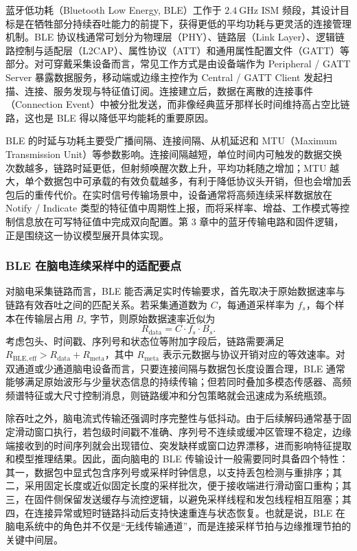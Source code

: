 蓝牙低功耗（Bluetooth Low Energy, BLE）工作于 $2.4\ \text{GHz}$ ISM 频段，其设计目标是在牺牲部分持续吞吐能力的前提下，获得更低的平均功耗与更灵活的连接管理机制。BLE 协议栈通常可划分为物理层（PHY）、链路层（Link Layer）、逻辑链路控制与适配层（L2CAP）、属性协议（ATT）和通用属性配置文件（GATT）等部分。对可穿戴采集设备而言，常见工作方式是由设备端作为 Peripheral / GATT Server 暴露数据服务，移动端或边缘主控作为 Central / GATT Client 发起扫描、连接、服务发现与特征值订阅。连接建立后，数据在离散的连接事件（Connection Event）中被分批发送，而非像经典蓝牙那样长时间维持高占空比链路，这也是 BLE 得以降低平均能耗的重要原因。

BLE 的时延与功耗主要受广播间隔、连接间隔、从机延迟和 MTU（Maximum Transmission Unit）等参数影响。连接间隔越短，单位时间内可触发的数据交换次数越多，链路时延更低，但射频唤醒次数上升，平均功耗随之增加；MTU 越大，单个数据包中可承载的有效负载越多，有利于降低协议头开销，但也会增加丢包后的重传代价。在实时信号传输场景中，设备通常将高频连续采样数据放在 Notify / Indicate 类型的特征值中周期性上报，而将采样率、增益、工作模式等控制信息放在可写特征值中完成双向配置。第 3 章中的蓝牙传输电路和固件逻辑，正是围绕这一协议模型展开具体实现。

\subsubsection{BLE 在脑电连续采样中的适配要点}

对脑电采集链路而言，BLE 能否满足实时传输要求，首先取决于原始数据速率与链路有效吞吐之间的匹配关系。若采集通道数为 $C$，每通道采样率为 $f_s$，每个样本在传输层占用 $B_s$ 字节，则原始数据速率近似为
\begin{equation}
R_{\mathrm{data}} = C \cdot f_s \cdot B_s.
\label{eq:ble_rate}
\end{equation}
考虑包头、时间戳、序列号和状态位等附加字段后，链路需要满足 $R_{\mathrm{BLE,eff}} > R_{\mathrm{data}} + R_{\mathrm{meta}}$，其中 $R_{\mathrm{meta}}$ 表示元数据与协议开销对应的等效速率。对双通道或少通道脑电设备而言，只要连接间隔与数据包长度设置合理，BLE 通常能够满足原始波形与少量状态信息的持续传输；但若同时叠加多模态传感器、高频频谱特征或大尺寸控制消息，则链路缓冲和分包策略就会迅速成为系统瓶颈。

除吞吐之外，脑电流式传输还强调时序完整性与低抖动。由于后续解码通常基于固定滑动窗口执行，若包级时间戳不准确、序列号不连续或缓冲区管理不稳定，边缘端接收到的时间序列就会出现错位、突发缺样或窗口边界漂移，进而影响特征提取和模型推理结果。因此，面向脑电的 BLE 传输设计一般需要同时具备四个特性：其一，数据包中显式包含序列号或采样时钟信息，以支持丢包检测与重排序；其二，采用固定长度或近似固定长度的采样批次，便于接收端进行滑动窗口重构；其三，在固件侧保留发送缓存与流控逻辑，以避免采样线程和发包线程相互阻塞；其四，在连接异常或短时链路抖动后支持快速重连与状态恢复。也就是说，BLE 在脑电系统中的角色并不仅是“无线传输通道”，而是连接采样节拍与边缘推理节拍的关键中间层。

